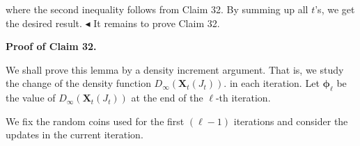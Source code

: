 where the second inequality follows from Claim 32.
By summing up all $t$’s, we get the desired result.
$\blacktriangleleft$
It remains to prove Claim 32.\par





\par\medskip\noindent\textbf{
\textbf{Proof of Claim 32}.}\par




We shall prove this lemma by a density increment argument.
That is, we study the change of the density function $D_{\infty}(\bm{X}_{t}(J_{t})).$ in each iteration.
Let $\bm{\phi_{\ell}}$ be the value of $D_{\infty}(\bm{X}_{t}(J_{t}))$ at the end of the $\ell$-th iteration.\par




We fix the random coins used for the first $(\ell-1)$ iterations and consider the updates in the current iteration.\par


